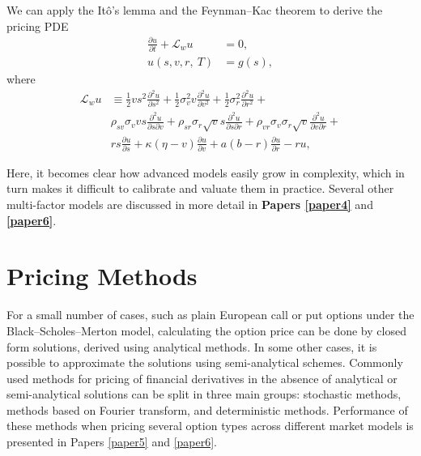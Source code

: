 \documentclass{UUThesisTemplate}
\begin{document}
\par
We can apply the It\^{o}'s lemma and the Feynman--Kac theorem to derive the pricing PDE
\begin{align}
\frac{\partial u}{\partial t}+\mathcal{L}_w u&=0, \nonumber \\
u(s,v,r,\ T) &= g(s), \label{hhwPDE}
\end{align}
where
\begin{align}
\mathcal{L}_{w} u &\equiv  \frac{1}{2}vs^2\frac{\partial^2 u}{\partial s^2} + \frac{1}{2}\sigma_v^2v\frac{\partial^2 u}{\partial v^2}  + \frac{1}{2}\sigma_r^2\frac{\partial^2 u}{\partial r^2} + \nonumber \\
                             & \rho_{sv}\sigma_v vs\frac{\partial^2 u}{\partial s\partial v} + \rho_{sr}\sigma_r \sqrt{v} s\frac{\partial^2 u}{\partial s\partial r} + \rho_{vr}\sigma_v\sigma_r \sqrt{v}\frac{\partial^2 u}{\partial v\partial r} + \nonumber \\
                             & rs\frac{\partial u}{\partial s} + \kappa(\eta-v)\frac{\partial u}{\partial v} + a(b-r)\frac{\partial u}{\partial r} - ru, \label{eqHHWop}
\end{align}

\par
Here, it becomes clear how advanced models easily grow in complexity, which in turn makes it difficult to calibrate and valuate them in practice. Several other multi-factor models are discussed in more detail in \textbf{Papers \ref{paper4}} and \textbf{\ref{paper6}}. 
%





%
\section{Pricing Methods}
\label{sec:methods}

\par
For a small number of cases, such as plain European call or put options under the Black--Scholes--Merton model, calculating the option price can be done by closed form solutions, derived using analytical methods. In some other cases, it is possible to approximate the solutions using semi-analytical schemes. Commonly used methods for pricing of financial derivatives in the absence of analytical or semi-analytical solutions can be split in three main groups: stochastic methods, methods based on Fourier transform, and deterministic methods. Performance of these methods when pricing several option types across different market models is presented in Papers \ref{paper5} and \ref{paper6}.%
\end{document}
